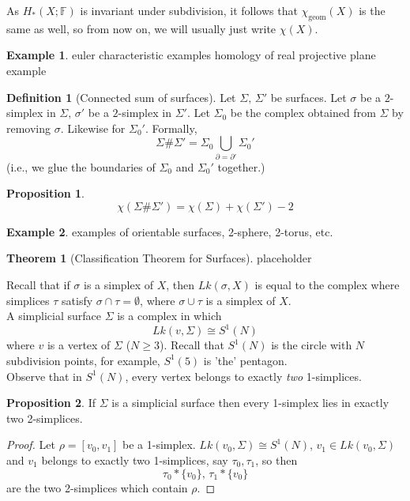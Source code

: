 \documentclass[a4paper,14pt]{extarticle}
\theoremstyle{definition}
\newtheorem*{theorem}{Theorem}
\newtheorem*{definition}{Definition}
\newtheorem*{proposition}{Proposition}
\newtheorem*{eg}{Example}
\begin{document}
As $H_*(X;\mathbb{F})$ is invariant under subdivision, it follows that $\chi_\text{geom}(X)$
is the same as well, so from now on, we will usually just write $\chi(X)$.

\begin{eg}
	euler characteristic examples
	homology of real projective plane example
\end{eg}

\begin{definition}[Connected sum of surfaces]
	Let $\Sigma, \,\Sigma'$ be surfaces. Let $\sigma$ be a $2$-simplex in $\Sigma, \,\sigma'$ 
	be a $2$-simplex in $\Sigma'$. Let $\Sigma_0$ be the complex obtained from $\Sigma$ by 
	removing $\sigma$. Likewise for $\Sigma_0'$. Formally,
	\[\Sigma\#\Sigma'=\Sigma_0\bigcup_{\partial=\partial'}\Sigma_0'\]
	(i.e., we glue the boundaries of $\Sigma_0$ and $\Sigma_0'$ together.)
\end{definition}

\begin{proposition}
	\[\chi(\Sigma\#\Sigma')=\chi(\Sigma)+\chi(\Sigma')-2\]
\end{proposition}

\begin{eg}
	examples of orientable surfaces, 2-sphere, 2-torus, etc.
\end{eg}

\begin{theorem}[Classification Theorem for Surfaces]
	placeholder
\end{theorem}

Recall that if $\sigma$ is a simplex of $X$, then $Lk(\sigma, X)$ is equal to the complex where simplices $\tau$ satisfy $\sigma\cap\tau=\emptyset$, where $\sigma\cup\tau$ is a simplex
of $X$. \\

A simplicial surface $\Sigma$ is a complex in which \[Lk(v,\Sigma)\cong S^1(N)\] where
$v$ is a vertex of $\Sigma$ ($N\geq3$). Recall that $S^1(N)$ is the circle with $N$ 
subdivision points, for example, $S^1(5)$ is 'the' pentagon. \\

Observe that in $S^1(N)$, every vertex belongs to exactly \emph{two} 1-simplices.

\begin{proposition}
	If $\Sigma$ is a simplicial surface then every 1-simplex lies in exactly two 2-simplices.
\end{proposition}

\begin{proof}
	Let $\rho=[v_0, v_1]$ be a 1-simplex. $Lk(v_0,\Sigma)\cong S^1(N)$, $v_1\in Lk(v_0,\Sigma)$
	and $v_1$ belongs to exactly two 1-simplices, say $\tau_0,\tau_1$, so then
	\[\tau_0*\{v_0\},\,\tau_1*\{v_0\}\] are the two 2-simplices which contain $\rho$.
\end{proof}
\end{document}
